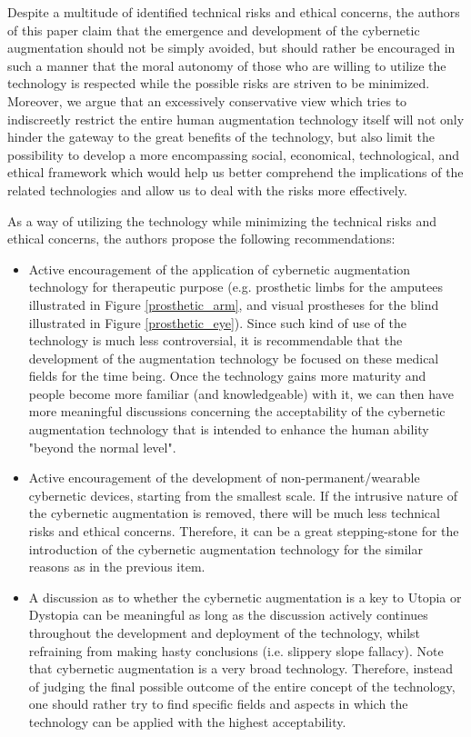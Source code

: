 Despite a multitude of identified technical risks and ethical concerns, the authors of this paper claim that the emergence and development of the cybernetic augmentation should not be simply avoided, but should rather be encouraged in such a manner that the moral autonomy of those who are willing to utilize the technology is respected while the possible risks are striven to be minimized. Moreover, we argue that an excessively conservative view which tries to indiscreetly restrict the entire human augmentation technology itself will not only hinder the gateway to the great benefits of the technology, but also limit the possibility to develop a more encompassing social, economical, technological, and ethical framework which would help us better comprehend the implications of the related technologies and allow us to deal with the risks more effectively.

As a way of utilizing the technology while minimizing the technical risks and ethical concerns, the authors propose the following recommendations:
\begin{itemize}
	\item Active encouragement of the application of cybernetic augmentation technology for therapeutic purpose (e.g. prosthetic limbs for the amputees illustrated in Figure \ref{prosthetic_arm}, and visual prostheses for the blind illustrated in Figure \ref{prosthetic_eye}). Since such kind of use of the technology is much less controversial, it is recommendable that the development of the augmentation technology be focused on these medical fields for the time being. Once the technology gains more maturity and people become more familiar (and knowledgeable) with it, we can then have more meaningful discussions concerning the acceptability of the cybernetic augmentation technology that is intended to enhance the human ability "beyond the normal level".
	\item Active encouragement of the development of non-permanent/wearable cybernetic devices, starting from the smallest scale. If the intrusive nature of the cybernetic augmentation is removed, there will be much less technical risks and ethical concerns. Therefore, it can be a great stepping-stone for the introduction of the cybernetic augmentation technology for the similar reasons as in the previous item. 
	\item A discussion as to whether the cybernetic augmentation is a key to Utopia or Dystopia can be meaningful as long as the discussion actively continues throughout the development and deployment of the technology, whilst refraining from making hasty conclusions (i.e. slippery slope fallacy). Note that cybernetic augmentation is a very broad technology. Therefore, instead of judging the final possible outcome of the entire concept of the technology, one should rather try to find specific fields and aspects in which the technology can be applied with the highest acceptability. 
\end{itemize}

